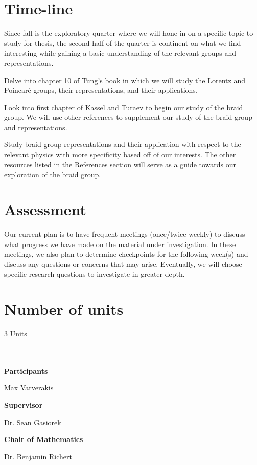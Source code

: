 \documentclass[oneside]{memoir}
\begin{document}
\section{Time-line}

Since fall is the exploratory quarter where we will hone in on a specific topic to study for thesis, the second half of the quarter is continent on what we find interesting while gaining a basic understanding of the relevant groups and representations.
\begin{description}[topsep=0pt,itemsep=0ex]
    \item[\parbox{5em}{Weeks 1-2}] Delve into chapter 10 of Tung's book in which we will study the Lorentz and Poincar\'e groups, their representations, and their applications.
    \item[\parbox{5em}{Week 3-5}] Look into first chapter of Kassel and Turaev to begin our study of the braid group.  We will use other references to supplement our study of the braid group and representations.
    \item[\parbox{5em}{Weeks 6-10}] Study braid group representations and their application with respect to the relevant physics with more specificity based off of our interests.  The other resources listed in the References section will serve as a guide towards our exploration of the braid group.
\end{description}




\section{Assessment}

Our current plan is to have frequent meetings (once/twice weekly) to discuss what progress we have made on the material under investigation.  In these meetings, we also plan to determine checkpoints for the following week(s) and discuss any questions or concerns that may arise.  Eventually, we will choose specific research questions to investigate in greater depth.

\section{Number of units}

3 Units

\vspace{1in}
\dotfill\\\\
\textbf{Participants}

\parbox{11em}{Max Varverakis} %

\textbf{Supervisor}

\parbox{11em}{Dr. Sean Gasiorek} %

\textbf{Chair of Mathematics}

\parbox{11em}{Dr. Benjamin Richert} %
\end{document}
